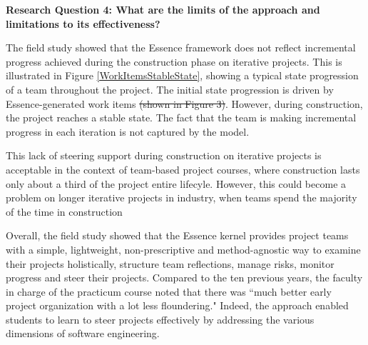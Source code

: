 \documentclass[preprint,12pt,3p]{elsarticle}
\begin{document}
\textbf{Research Question 4: What are the limits of the approach and limitations to its effectiveness?}

The field study showed that the Essence framework does not reflect incremental progress achieved during the  construction phase on iterative projects. This is illustrated in Figure \ref{WorkItemsStableState}, showing a typical state progression of a team throughout the project. The initial state progression is driven by Essence-generated work items \sout{(shown in Figure 3)}. However, during construction, the project reaches a stable state. The fact that the team is making incremental progress in each iteration is not captured by the model. 

This lack of steering support during construction on iterative projects is acceptable in the context of team-based project courses, where construction lasts only about a third of the project entire lifecyle. However, this could become a problem on longer iterative projects in industry, when teams spend the majority of the time in construction


Overall, the field study showed that the Essence kernel provides project teams with a simple, lightweight, non-prescriptive and method-agnostic way to examine their projects holistically, structure team reflections, manage risks, monitor progress and steer their projects. Compared to the ten previous years, the faculty in charge of the practicum course noted that there was ``much better early project organization with a lot less floundering." Indeed, the approach enabled students to learn to steer projects effectively by addressing the various dimensions of software engineering.
\end{document}
